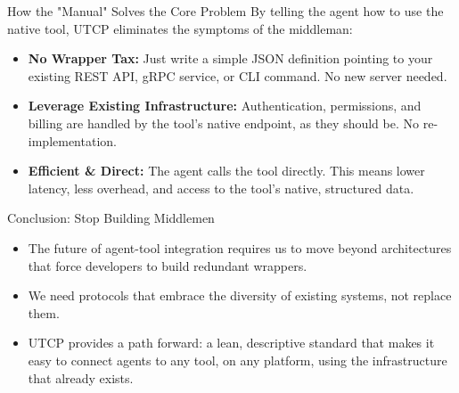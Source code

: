 \documentclass{beamer}
\begin{document}
\begin{frame}{How the "Manual" Solves the Core Problem}
  By telling the agent how to use the native tool, UTCP eliminates the symptoms of the middleman:
  \begin{itemize}
    \item<1-> \textbf{No Wrapper Tax:} Just write a simple JSON definition pointing to your existing REST API, gRPC service, or CLI command. No new server needed.
    \vfill
    \item<2-> \textbf{Leverage Existing Infrastructure:} Authentication, permissions, and billing are handled by the tool's native endpoint, as they should be. No re-implementation.
    \vfill
    \item<3-> \textbf{Efficient & Direct:} The agent calls the tool directly. This means lower latency, less overhead, and access to the tool's native, structured data.
  \end{itemize}
\end{frame}

\begin{frame}{Conclusion: Stop Building Middlemen}
  \begin{itemize}
    \item The future of agent-tool integration requires us to move beyond architectures that force developers to build redundant wrappers.
    \vfill
    \item We need protocols that embrace the diversity of existing systems, not replace them.
    \vfill
    \item UTCP provides a path forward: a lean, descriptive standard that makes it easy to connect agents to any tool, on any platform, using the infrastructure that already exists.
  \end{itemize}
\end{frame}
\end{document}
